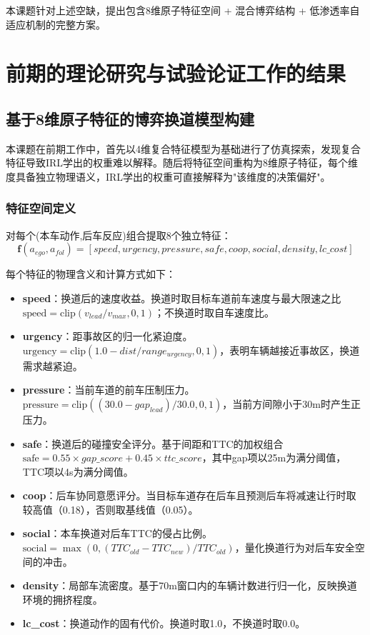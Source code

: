 本课题针对上述空缺，提出包含8维原子特征空间 + 混合博弈结构 + 低渗透率自适应机制的完整方案。

\section{前期的理论研究与试验论证工作的结果}

\subsection{基于8维原子特征的博弈换道模型构建}
本课题在前期工作中，首先以4维复合特征模型为基础进行了仿真探索，发现复合特征导致IRL学出的权重难以解释。随后将特征空间重构为8维原子特征，每个维度具备独立物理语义，IRL学出的权重可直接解释为"该维度的决策偏好"。

\subsubsection{特征空间定义}
对每个(本车动作,后车反应)组合提取8个独立特征：
\begin{equation}
\mathbf{f}(a_{ego}, a_{fol}) = [speed, urgency, pressure, safe, coop, social, density, lc\_cost]
\end{equation}

每个特征的物理含义和计算方式如下：

\begin{itemize}
    \item \textbf{speed}：换道后的速度收益。换道时取目标车道前车速度与最大限速之比 $\text{speed} = \text{clip}(v_{lead}/v_{max}, 0, 1)$；不换道时取自车速度比。
    \item \textbf{urgency}：距事故区的归一化紧迫度。$\text{urgency} = \text{clip}(1.0 - dist / range_{urgency}, 0, 1)$，表明车辆越接近事故区，换道需求越紧迫。
    \item \textbf{pressure}：当前车道的前车压制压力。$\text{pressure} = \text{clip}((30.0 - gap_{lead}) / 30.0, 0, 1)$，当前方间隙小于30m时产生正压力。
    \item \textbf{safe}：换道后的碰撞安全评分。基于间距和TTC的加权组合 $\text{safe} = 0.55 \times gap\_score + 0.45 \times ttc\_score$，其中gap项以25m为满分阈值，TTC项以4s为满分阈值。
    \item \textbf{coop}：后车协同意愿评分。当目标车道存在后车且预测后车将减速让行时取较高值（0.18），否则取基线值（0.05）。
    \item \textbf{social}：本车换道对后车TTC的侵占比例。$\text{social} = \max(0, (TTC_{old} - TTC_{new}) / TTC_{old})$，量化换道行为对后车安全空间的冲击。
    \item \textbf{density}：局部车流密度。基于70m窗口内的车辆计数进行归一化，反映换道环境的拥挤程度。
    \item \textbf{lc\_cost}：换道动作的固有代价。换道时取1.0，不换道时取0.0。
\end{itemize}

